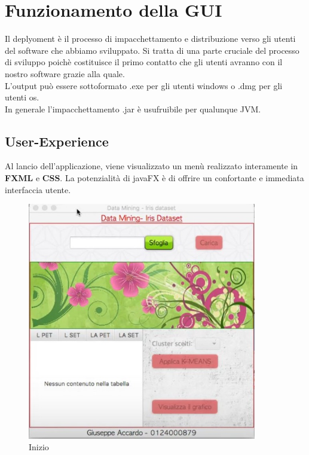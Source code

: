 \documentclass[a4paper, oneside]{book}
\begin{document}
\pagestyle{myheadings} 
\chapter*{Funzionamento della GUI}
\pagestyle{myheadings}
Il deplyoment è il processo di impacchettamento e distribuzione verso gli utenti del software che abbiamo sviluppato. Si tratta di una parte cruciale del processo di sviluppo poichè costituisce il primo contatto che gli utenti avranno con il nostro software grazie alla quale. \\
L'output può essere sottoformato .exe per gli utenti windows o .dmg per gli utenti os. \\ 
In generale l'impacchettamento .jar è usufruibile per qualunque JVM.
\large
\section*{User-Experience}
Al lancio dell'applicazione, viene visualizzato un menù realizzato interamente in \textbf{FXML} e \textbf{CSS}. 
La potenzialità di javaFX è di offrire un confortante e immediata interfaccia utente.
\begin{figure}[htp]
\centering
\includegraphics[width=10cm]{1.bmp}
\caption{Inizio}
\label{fig:Inizio}
\end{figure}
\end{document}
